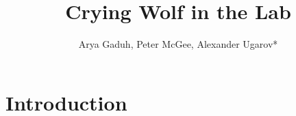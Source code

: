 \documentclass[11pt,a4paper]{article}
\title{\Large Crying Wolf in the Lab\\}
\author{\large Arya Gaduh, Peter McGee, Alexander Ugarov*}
\begin{document}
\maketitle
\onehalfspacing
\begin{abstract}{ }


\vspace{10pt}
\begin{singlespace}

\end{singlespace}
\end{abstract}

\vspace{140pt}
\footnotesize






\onehalfspacing
\normalsize
\newpage
\section{Introduction}

\appendix
\end{document}
